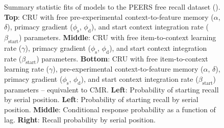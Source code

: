 \documentclass[
  man,
  floatsintext,
  longtable,
  nolmodern,
  notxfonts,
  notimes,
  draftfirst,
  colorlinks=true,linkcolor=blue,citecolor=blue,urlcolor=blue]{apa7}
\begin{document}
\begin{figure}

\caption{\label{fig-fitlagcrp}Summary statistic fits of models to the
PEERS free recall dataset (). \textbf{Top}: CRU with free pre-experimental
context-to-feature memory (\(\alpha\), \(\delta\)), primacy gradient
(\(\phi_\text{s}\), \(\phi_\text{d}\)), and start context integration
rate (\(\beta_\text{start}\)) parameters. \textbf{Middle}: CRU with free
item-to-context learning rate (\(\gamma\)), primacy gradient
(\(\phi_\text{s}\), \(\phi_\text{d}\)), and start context integration
rate (\(\beta_\text{start}\)) parameters. \textbf{Bottom}: CRU with free
item-to-context learning rate (\(\gamma\)), pre-experimental
context-to-feature memory (\(\alpha\), \(\delta\)), primacy gradient
(\(\phi_\text{s}\), \(\phi_\text{d}\)), and start context integration
rate (\(\beta_\text{start}\)) parameters -- equivalent to CMR.
\textbf{Left}: Probability of starting recall by serial position.
\textbf{Left}: Probability of starting recall by serial position.
\textbf{Middle}: Conditional response probability as a function of lag.
\textbf{Right}: Recall probability by serial position.}


\end{figure}
\end{document}
